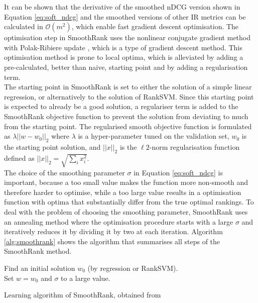 It can be shown that the derivative of the smoothed \ac{nDCG} version shown in Equation \ref{eq:soft_ndcg} and the smoothed versions of other \ac{IR} metrics can be calculated in $\mathcal{O}(m^2)$, which enable fast gradient descent optimisation. The optimisation step in SmoothRank uses the nonlinear conjugate gradient method  with Polak-Ribiere update \cite{Shewchuk1994}, which is a type of gradient descent method. This optimisation method is prone to local optima, which is alleviated by adding a pre-calculated, better than naive, starting point and by adding a regularisation term.\\

The starting point in SmoothRank is set to either the solution of a simple linear regression, or alternatively to the solution of Rank\acs{SVM}. Since this starting point is expected to already be a good solution, a regulariser term is added to the SmoothRank objective function to prevent the solution from deviating to much from the starting point. The regularised smooth objective function is formulated as $\lambda||w-w_0||_2$ where $\lambda$ is a hyper-parameter tuned on the validation set, $w_0$ is the starting point solution, and $||x||_2$ is the $\ell2$-norm regularisation function defined as $||x||_2 = \sqrt{\sum\nolimits_ix_i^2}$.\\

The choice of the smoothing parameter $\sigma$ in Equation \ref{eq:soft_ndcg} is important, because a too small value makes the function more non-smooth and therefore harder to optimise, while a too large value results in a optimisation function with optima that substantially differ from the true optimal rankings. To deal with the problem of choosing the smoothing parameter, SmoothRank uses an annealing method where the optimisation procedure starts with a large $\sigma$ and iteratively reduces it by dividing it by two at each iteration. Algorithm \ref{alg:smoothrank} shows the algorithm that summarises all steps of the SmoothRank method.\\
\LinesNumbered
\begin{algorithm}[H]
 Find an initial solution $w_0$ (by regression or Rank\acs{SVM}).\\
 Set $w = w_0$ and $\sigma$ to a large value.\\
 \caption{Learning algorithm of SmoothRank, obtained from \cite{Chapelle2010}}
 \label{alg:smoothrank}
\end{algorithm}

